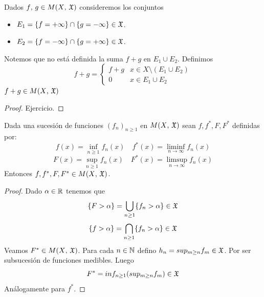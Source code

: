 \begin{note}
    Dados \(f\text{, } g \in M(X\text{, } \mathfrak{X})\) consideremos los conjuntos \begin{itemize}
        \item \(E_1 = \{ f = + \infty \} \cap \{ g = - \infty \} \in \mathfrak{X}\).
        \item \(E_2 = \{ f = - \infty \} \cap \{ g = + \infty \} \in \mathfrak{X}\).
    \end{itemize}
    Notemos que no está definida la suma \(f + g\) en \(E_1 \cup E_2\).
    Definimos \begin{equation*}
        f+g = \begin{cases}
            f+g & x \in X \setminus (E_1 \cup E_2) \\
            0   & x \in E_1 \cup E_2
        \end{cases}
    \end{equation*}
    \(f+g \in M(X\text{, } \mathfrak{X})\)
    \begin{proof}
        Ejercicio.
    \end{proof}
\end{note}

\begin{lemma}
    Dada una sucesión de funciones \((f_n)_{n \geq 1}\) en \(M(X\text{, } \mathfrak{X})\) sean \(f, f^*, F, F^*\) definidas por:
    \begin{equation*}
        f(x) = \inf_{n \geq 1} f_n(x) \quad f^*(x) = \liminf_{n \to \infty} f_n(x)
    \end{equation*}
    \begin{equation*}
        F(x) = \sup_{n \geq 1} f_n(x) \quad F^*(x) = \limsup_{n \to \infty} f_n(x)
    \end{equation*}
    Entonces \(f, f^*, F, F^* \in M(X\text{, } \mathfrak{X})\).
    \begin{proof}
        Dado \(\alpha \in \mathbb{R}\) tenemos que \begin{equation*}
            \{ F > \alpha \} = \bigcup_{n \geq 1} \{ f_n > \alpha \} \in \mathfrak{X}
        \end{equation*}
        \begin{equation*}
            \{ f > \alpha \} = \bigcap_{n \geq 1} \{ f_n > \alpha \} \in \mathfrak{X}
        \end{equation*}
        Veamos \(F^* \in M(X\text{, } \mathfrak{X})\). Para cada \(n \in \mathbb{N}\) defino \(h_n = sup_{m \geq n} f_m \in \mathfrak{X}\). Por ser subsucesión de funciones medibles.
        Luego \begin{equation*}
            F^* = inf_{n \geq 1} (sup_{m \geq n} f_m) \in \mathfrak{X}
        \end{equation*}
        Análogamente para \(f^*\).
    \end{proof}
\end{lemma}

